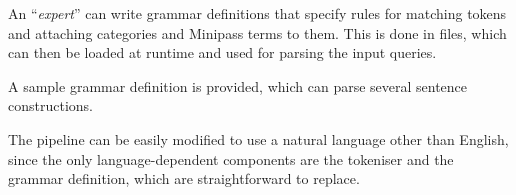 \documentclass[main.tex]{subfiles}
\begin{document}
An ``\emph{expert}'' can write grammar definitions that specify rules for matching
tokens and attaching categories and Minipass terms to them. This is done in
 files, which can then be loaded at runtime and used for parsing the
input queries.

A sample grammar definition is provided, which can parse several sentence
constructions.

The pipeline can be easily modified to use a natural language other than
English, since the only language-dependent components are the tokeniser and
the grammar definition, which are straightforward to replace.
\end{document}
